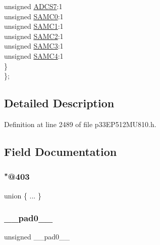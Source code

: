 \begin{DoxyCompactItemize}
\begin{tabbing}
\>\>unsigned \hyperlink{structtag_a_d1_c_o_n3_b_i_t_s_a8f0f24abf568326a16f0368565baf5c2}{ADCS7}:1\\
\>\>unsigned \hyperlink{structtag_a_d1_c_o_n3_b_i_t_s_a07d2c9b1a4fcb5fd2a7acc216e8aecab}{SAMC0}:1\\
\>\>unsigned \hyperlink{structtag_a_d1_c_o_n3_b_i_t_s_aff3b08f0520090b987ff1fa5e8d90f07}{SAMC1}:1\\
\>\>unsigned \hyperlink{structtag_a_d1_c_o_n3_b_i_t_s_a671fcd1368ca4d1e5ed73025de208220}{SAMC2}:1\\
\>\>unsigned \hyperlink{structtag_a_d1_c_o_n3_b_i_t_s_a15086a4b474d7cfc569c16b62b95a82d}{SAMC3}:1\\
\>\>unsigned \hyperlink{structtag_a_d1_c_o_n3_b_i_t_s_a3bc46ad0a1f495c6419955fb68aafe49}{SAMC4}:1\\
\>\} \\
\}; \\

\end{tabbing}\end{DoxyCompactItemize}


\subsection{Detailed Description}


Definition at line 2489 of file p33\+E\+P512\+M\+U810.\+h.



\subsection{Field Documentation}
\mbox{\label{structtag_a_d1_c_o_n3_b_i_t_s_afb9f9f6ce447ddc2b720fefa03d68e92}} 
\subsubsection{\texorpdfstring{"@403}{@403}}
{\footnotesize\ttfamily union \{ ... \} }

\mbox{\label{structtag_a_d1_c_o_n3_b_i_t_s_adf71f3d8410c1f1dbbc96680a92c49af}} 
\subsubsection{\texorpdfstring{\+\_\+\+\_\+pad0\+\_\+\+\_\+}{\_\_pad0\_\_}}
{\footnotesize\ttfamily unsigned \+\_\+\+\_\+pad0\+\_\+\+\_\+}



